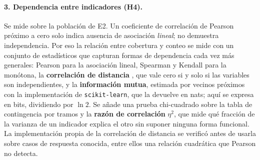 \paragraph{3. Dependencia entre indicadores (H4).} Se mide sobre la población de E2. Un
coeficiente de correlación de Pearson
próximo a cero solo indica ausencia de asociación \textit{lineal}; no demuestra independencia.
Por eso la relación entre cobertura y conteo se mide con un conjunto de estadísticos que
capturan formas de dependencia cada vez más generales: Pearson para la asociación lineal,
Spearman y Kendall para la monótona, la \textbf{correlación de distancia}
\citep{szekely2007dcor}, que vale cero si y solo si las variables son independientes, y la
\textbf{información mutua}, estimada por vecinos próximos \citep{kraskov2004mi} con la
implementación de \texttt{scikit-learn}, que la devuelve en nats; aquí se expresa en bits,
dividiendo por $\ln 2$. Se añade una
prueba chi-cuadrado sobre la tabla de contingencia por tramos y la \textbf{razón de correlación}
$\eta^2$, que mide qué fracción de la varianza de un indicador explica el otro sin suponer
ninguna forma funcional. La implementación propia de la correlación de distancia se verificó
antes de usarla sobre casos de respuesta conocida, entre ellos una relación cuadrática que
Pearson no detecta.

